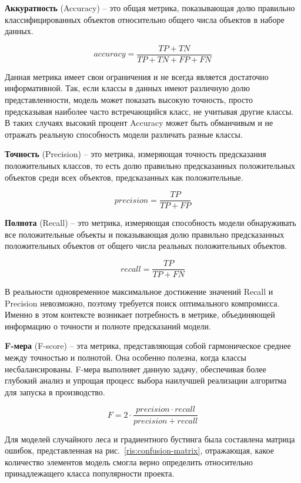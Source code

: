 \textbf{Аккуратность} (Accuracy) -- это общая метрика, показывающая долю правильно классифицированных объектов относительно общего числа объектов в наборе данных. 

\[
accuracy = \frac{TP + TN}{TP + TN + FP + FN}
\]

\vspace{1.5em}
    
Данная метрика имеет свои ограничения и не всегда является достаточно информативной. Так, если классы в данных имеют различную долю представленности, модель может показать высокую точность, просто предсказывая наиболее часто встречающийся класс, не учитывая другие классы. В таких случаях высокий процент Accuracy может быть обманчивым и не отражать реальную способность модели различать разные классы. 

\textbf{Точность} (Precision) -- это метрика, измеряющая точность предсказания положительных классов, то есть долю правильно предсказанных положительных объектов среди всех объектов, предсказанных как положительные. 

\[
precision = \frac{TP}{TP+FP}
\]

\vspace{1.5em}

\textbf{Полнота} (Recall) -- это метрика, измеряющая способность модели обнаруживать все положительные объекты и показывающая долю правильно предсказанных положительных объектов от общего числа реальных положительных объектов.

\[
recall = \frac{TP}{TP+FN}
\]

\vspace{1.5em}

В реальности одновременное максимальное достижение значений Recall и Precision невозможно, поэтому требуется поиск оптимального компромисса. Именно в этом контексте возникает потребность в метрике, объединяющей информацию о точности и полноте предсказаний модели. 

\textbf{F-мера} (F-score) -- эта метрика, представляющая собой гармоническое среднее между точностью и полнотой. Она особенно полезна, когда классы несбалансированы. F-мера выполняет данную задачу, обеспечивая более глубокий анализ и упрощая процесс выбора наилучшей реализации алгоритма для запуска в производство.

\[
F = 2\cdot \frac{precision \cdot recall}{precision+recall}
\]

\vspace{1.5em}

Для моделей случайного леса и градиентного бустинга была составлена матрица ошибок, представленная на рис.~\ref{ris:confusion-matrix}, отражающая, какое количество элементов модель смогла верно определить относительно принадлежащего класса популярности проекта. 

